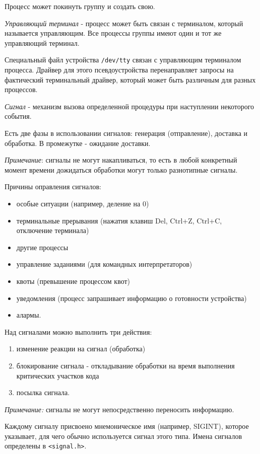 Процесс может покинуть группу и создать свою.

\emph{Управляющий терминал} - процесс может быть связан с терминалом, который называется управляющим. Все процессы группы имеют один и тот же управляющий терминал.

Специальный файл устройства \verb+/dev/tty+ связан с управляющим терминалом процесса. Драйвер для этого псевдоустройства перенаправляет запросы на фактический терминальный драйвер, который может быть различным для разных процессов.

\emph{Сигнал} - механизм вызова определенной процедуры при наступлении некоторого события.

Есть две фазы в использовании сигналов: генерация (отправление), доставка и обработка. В промежутке - ожидание доставки.

\emph{Примечание}: сигналы не могут накапливаться, то есть в любой конкретный момент времени дожидаться обработки могут только разнотипные сигналы.

Причины оправления сигналов:
\begin{itemize}
\item особые ситуации (например, деление на 0)
\item терминальные прерывания (нажатия клавиш Del, Ctrl+Z, Ctrl+C, отключение терминала)
\item другие процессы
\item управление заданиями (для командных интерпретаторов)
\item квоты (превышение процессом квот)
\item уведомления (процесс запрашивает информацию о готовности устройства)
\item алармы.
\end{itemize}

Над сигналами можно выполнить три действия:
\begin{enumerate}
\item изменение реакции на сигнал (обработка)
\item блокирование сигнала - откладывание обработки на время выполнения критических участков кода
\item посылка сигнала.
\end{enumerate}

\emph{Примечание:} сигналы не могут непосредственно переносить информацию.

Каждому сигналу присвоено мнемоническое имя (например, SIGINT), которое указывает, для чего обычно используется сигнал этого типа.  Имена сигналов определены в \verb+<signal.h>+.

